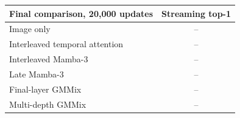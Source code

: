 \begin{tabular}{lc}
\hline
Final comparison, 20,000 updates & Streaming top-1 \\
\hline
Image only & -- \\
Interleaved temporal attention & -- \\
Interleaved Mamba-3 & -- \\
Late Mamba-3 & -- \\
Final-layer GMMix & -- \\
Multi-depth GMMix & -- \\
\hline
\end{tabular}
